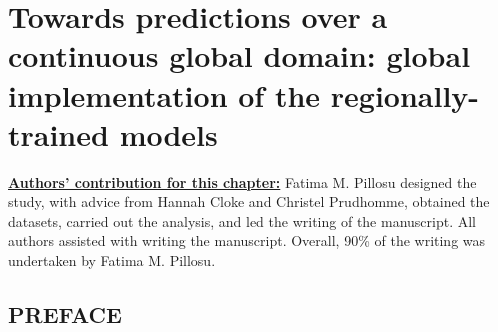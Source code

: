 \ClearShipoutPicture
{}

\chapter{Towards predictions over a continuous global domain: 
global implementation of the regionally-trained models}
\label{regional_to_global_training}
\graphicspath{{chapter_07/figures}{chapter_07/tables}}

\underline{\textbf{Authors' contribution for this chapter:}} Fatima M. Pillosu designed the study, with advice from Hannah Cloke and Christel Prudhomme, obtained the datasets, carried out the analysis, and led the writing of the manuscript. All authors assisted with writing the manuscript. Overall, 90\% of the writing was undertaken by Fatima M. Pillosu.

\vspace{\baselineskip}

\section*{PREFACE}

